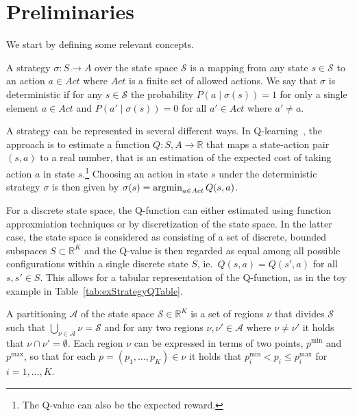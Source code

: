 \section{Preliminaries}%
\label{sec:preliminaries}

We start by defining some relevant concepts.

\begin{definition}[Strategy]%
    A strategy $\sigma : S \to A$ over the state space $\mathcal{S}$ is a
    mapping from any state $s \in \mathcal{S}$ to an action $a \in Act$ where
    $Act$ is a finite set of allowed actions. We say that $\sigma$ is
    deterministic if for any $s \in \mathcal{S}$ the probability
    $P(a\mid\sigma(s)) = 1$ for only a single element $a \in Act$ and
    $P(a'\mid\sigma(s)) = 0$ for all $a' \in Act$ where $a' \neq a$.
\end{definition}

A strategy can be represented in several different ways. In
Q-learning~\cite{Sutton1998}, the approach is to estimate a function $Q : S, A
\to \mathbb{R}$ that maps a state-action pair $(s,a)$ to a real number, that is
an estimation of the expected cost of taking action $a$ in state
$s$.\footnote{The Q-value can also be the expected reward.} Choosing an action
in state $s$ under the deterministic strategy $\sigma$ is then given by
$\sigma(s) = \operatorname*{argmin}_{a \in Act}Q(s,a)$.

For a discrete state space, the Q-function can either estimated using function
approxmiation techniques or by discretization of the state space. In the latter
case, the state space is considered as consisting of a set of discrete, bounded
subspaces $S \subset \mathbb{R}^K$ and the Q-value is then regarded as equal
among all possible configurations within a single discrete state $S$, ie.\
$Q(s,a) = Q(s',a)$ for all $s,s' \in S$. This allows for a tabular
representation of the Q-function, as in the toy example in
Table~\ref{tab:exStrategyQTable}.

\begin{definition}[Partitions]%
    A partitioning $\mathcal{A}$ of the state space $\mathcal{S} \in
    \mathbb{R}^K$ is a set of regions $\nu$ that divides $\mathcal{S}$ such that
    $\bigcup_{\nu \in \mathcal{A}}\nu = \mathcal{S}$ and for any two regions
    $\nu, \nu' \in \mathcal{A}$ where $\nu \neq \nu'$ it holds that $\nu \cap
    \nu' = \emptyset$. Each region $\nu$ can be expressed in terms of two
    points, $p^{\min}$ and $p^{\max}$, so that for each $p = (p_1, \ldots, p_K)
    \in \nu$ it holds that $p^{\min}_i < p_i \le  p^{\max}_i$ for $i =
    1,\ldots,K$.
\end{definition}

